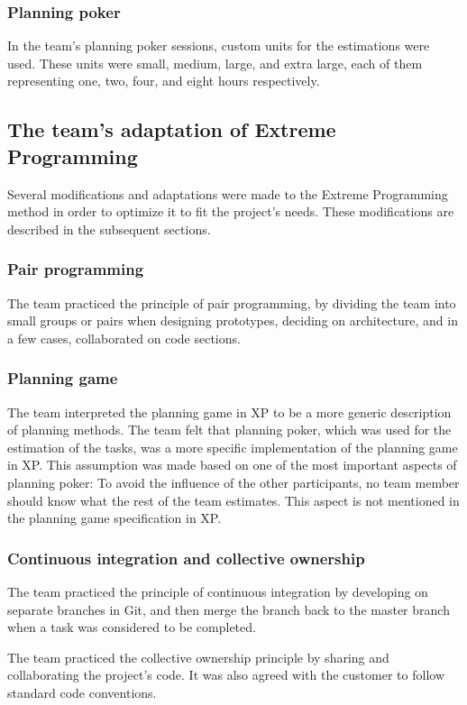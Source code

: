 \subsubsection{Planning poker}
In the team's planning poker sessions, custom units for the estimations were used. These units were small, medium, large, and extra large, each of them representing one, two, four, and eight hours respectively.

\subsection{The team's adaptation of Extreme Programming}
\label{sec:adapExtremeProgr}
Several modifications and adaptations were made to the Extreme Programming method in order to optimize it to fit the project's needs. These modifications are described in the subsequent sections.

\subsubsection{Pair programming}
The team practiced the principle of pair programming, by dividing the team into small groups or pairs when designing prototypes, deciding on architecture, and in a few cases, collaborated on code sections.

\subsubsection{Planning game}
The team interpreted the planning game in XP to be a more generic description of planning methods. The team felt that planning poker, which was used for the estimation of the tasks, was a more specific implementation of the planning game in XP. This assumption was made based on one of the most important aspects of planning poker: To avoid the influence of the other participants, no team member should know what the rest of the team estimates. This aspect is not mentioned in the planning game specification in XP.

\subsubsection{Continuous integration and collective ownership}
The team practiced the principle of continuous integration by developing on separate branches in Git, and then merge the branch back to the master branch when a task was considered to be completed.

The team practiced the collective ownership principle by sharing and collaborating the project's code. It was also agreed with the customer to follow standard code conventions.

